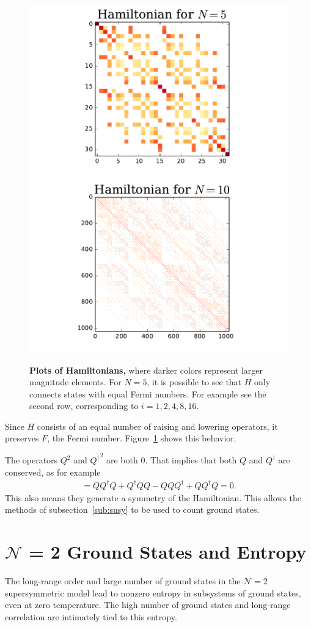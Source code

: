 \documentclass[12pt]{article} %
\renewcommand{\cal}{\mathcal}
\begin{document}
\begin{figure}
	\centering
	\includegraphics[width=.49\textwidth]{hamil5}
	\includegraphics[width=.49\textwidth]{hamil10}
	\caption{\textbf{Plots of Hamiltonians,} where darker colors represent larger magnitude elements. For $N=5$, it is possible to see that $H$ only connects states with equal Fermi numbers. For example see the second row, corresponding to $i=1,2,4,8,16$. }
	\label{fig:hamplot}
\end{figure}
Since $H$ consists of an equal number of raising and lowering operators, it preserves $F$, the Fermi number. Figure~\ref{fig:hamplot} shows this behavior.

The operators $Q^2$ and ${Q^\dag}^2$ are both 0. That implies that both $Q$ and $Q^\dag$ are conserved, as for example
\begin{align}
[H,Q] = QQ^\dag Q + Q^\dag QQ - QQQ^\dag + QQ^\dag Q = 0.
\end{align}
This also means they generate a symmetry of the Hamiltonian. This allows the methods of subsection~\ref{sub:susy} to be used to count ground states.

\section{$\cal{N}$ = 2 Ground States and Entropy} \label{sec:N2gs_ent}

The long-range order and large number of ground states in the $\cal N = 2$ supersymmetric model lead to nonzero entropy in subsystems of ground states, even at zero temperature. The high number of ground states and long-range correlation are intimately tied to this entropy.
\end{document}
